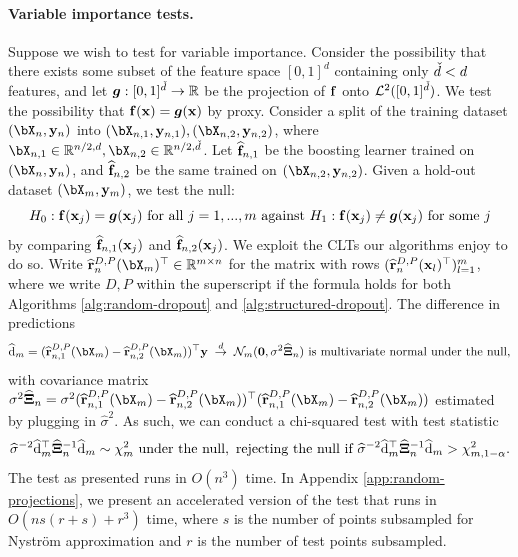 \paragraph{Variable importance tests.} Suppose we wish to test for variable importance. Consider the possibility that there exists some subset of the feature space $[0,1]^d$ containing only $\widecheck{d} < d$ features, and let $\g : [0,1]^{\widecheck{d}} \to \R$ be the projection of $\f$ onto $\gL^2([0,1]^{\widecheck{d}})$. We test the possibility that $\f(\bx) = \g({\bx})$ by proxy. Consider a split of the training dataset $(\bX_n, \by_n)$ into $(\bX_{n,1}, \by_{n,1}), (\bX_{n,2}, \by_{n,2})$, where $\bX_{n,1} \in \R^{n/2, d}, \bX_{n,2} \in \R^{n/2,\widecheck{d}}$. Let $\widehat{\f}_{n,1}$ be the boosting learner trained on $(\bX_n, \by_n)$, and $\widehat{\f}_{n,2}$ be the same trained on $({\bX}_{n,2}, \by_{n,2})$. Given a hold-out dataset $(\bX_m, \by_m)$, we test the null:
$$H_0 : \f(\bx_j) = \g({\bx}_j) \text{ for all } j=1,...,m \text{ against } H_1 : \f(\bx_j) \neq \g({\bx}_j) \text{ for some } j$$
by comparing $\widehat{\f}_{n,1}(\bx_j)$ and $\widehat{\f}_{n,2}({\bx}_j)$. We exploit the CLTs our algorithms enjoy to do so. Write $\widehat{\br}^{D,P}_n(\bX_m)^\top \in \R^{m \times n}$ for the matrix with rows $(\widehat{\br}^{D,P}_n(\bx_l)^\top)_{l=1}^m$, where we write $D,P$ within the superscript if the formula holds for both Algorithms \ref{alg:random-dropout} and \ref{alg:structured-dropout}. The difference in predictions 
$$\widehat{\d}_m = (\widehat{\br}^{D,P}_{n,1}(\bX_m) - \widehat{\br}^{D,P}_{n,2}(\bX_m))^\top \by \; \stackrel{d}{\to} \; \gN_m(\mathbf{0}, \sigma^2 \widehat{\bXi}_n) \text{ is multivariate normal under the null},$$
with covariance matrix $\sigma^2 \widehat{\bXi}_n = \sigma^2 (\widehat{\br}^{D,P}_{n,1}(\bX_m) - \widehat{\br}^{D,P}_{n,2}(\bX_m))^\top (\widehat{\br}^{D,P}_{n,1}(\bX_m) - \widehat{\br}^{D,P}_{n,2}(\bX_m))$ estimated by plugging in $\widehat{\sigma}^2$. As such, we can conduct a chi-squared test with test statistic
$$\widehat{\sigma}^{-2} \widehat{\d}_m^\top \widehat{\bXi}_n^{-1} \widehat{\d}_m \sim \chi_m^2 \text{ under the null}, \text{ rejecting the null if } \widehat{\sigma}^{-2} \widehat{\d}_m^\top \widehat{\bXi}_n^{-1} \widehat{\d}_m > \chi_{m,1-\alpha}^2.$$
The test as presented runs in $O(n^3)$ time. In Appendix \ref{app:random-projections}, we present an accelerated version of the test that runs in 
$O(ns(r+s) + r^3)$ time, where $s$ is the number of points subsampled for Nystr\"{o}m approximation and $r$ is the number of test points subsampled.

